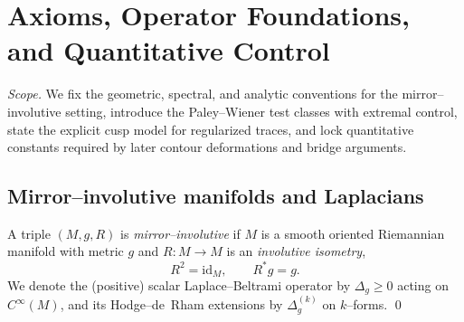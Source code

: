 
\section{Axioms, Operator Foundations, and Quantitative Control}
\label{sec:ch6-part1-axioms-foundations} \relax \hspace{0pt}
\FlowBreaker
\noindent\emph{Scope.} We fix the geometric, spectral, and analytic conventions for the mirror–involutive setting, introduce the Paley–Wiener test classes with extremal control, state the explicit cusp model for regularized traces, and lock quantitative constants required by later contour deformations and bridge arguments. %


\subsection{Mirror–involutive manifolds and Laplacians}
\label{subsec:ch6-part1-mirror-involutive} \relax \hspace{0pt}
\begin{definition}
\label{def:mirror-manifold}
A triple $(M,g,R)$ is \emph{mirror–involutive} if $M$ is a smooth oriented Riemannian manifold with metric $g$ and $R\!:M\to M$ is an \emph{involutive isometry},
\[
R^2=\mathrm{id}_M,\qquad R^*g=g.
\]
We denote the (positive) scalar Laplace–Beltrami operator by $\Delta_g\ge0$ acting on $C^\infty(M)$, and its Hodge–de~Rham extensions by $\Delta_g^{(k)}$ on $k$–forms. \qed
\end{definition}

